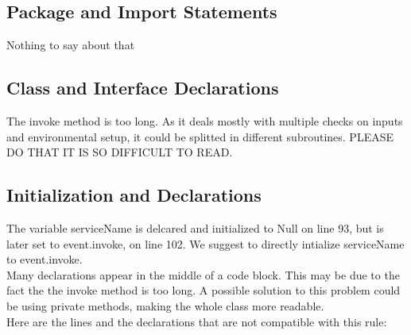 \documentclass{article}
\begin{document}
\subsection{Package and Import Statements}
Nothing to say about that

\subsection{Class and Interface Declarations}
The invoke method is too long. As it deals mostly with multiple checks on inputs and environmental setup, it could be splitted in different subroutines. PLEASE DO THAT IT IS SO DIFFICULT TO READ.

\subsection{Initialization and Declarations}
The variable serviceName is delcared and initialized to Null on line 93, but is later set to event.invoke, on line 102. We suggest to directly intialize serviceName to event.invoke.\\
Many declarations appear in the middle of a code block. This may be due to the fact the the invoke method is too long. A possible solution to this problem could be using private methods, making the whole class more readable.\\
Here are the lines and the declarations that are not compatible with this rule:
\end{document}
